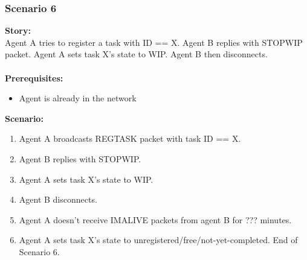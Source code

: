 \documentclass{article}
\begin{document}
\subsubsection{Scenario 6}
\noindent\textbf{Story:} \\
Agent A tries to register a task with ID == X. Agent B replies with STOPWIP packet. Agent A sets task X's state to WIP. Agent B then disconnects. \\\\
\textbf{Prerequisites:}
\begin{itemize}
    \item Agent is already in the network
\end{itemize}
\textbf{Scenario:}
\begin{enumerate}
    \item Agent A broadcasts REGTASK packet with task ID == X.
    \item Agent B replies with STOPWIP.
    \item Agent A sets task X's state to WIP.
    \item Agent B disconnects.
    \item Agent A doesn't receive IMALIVE packets from agent B for ??? minutes.
    \item Agent A sets task X's state to unregistered/free/not-yet-completed. End of Scenario 6.
\end{enumerate}
\end{document}
